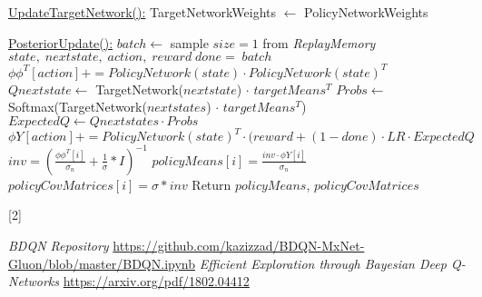 \documentclass{article}
\begin{document}
\begin{algorithm}
\begin{algorithmic}[2]
    \State \underline{UpdateTargetNetwork():}
        \State TargetNetworkWeights $\gets$ PolicyNetworkWeights

    \State \underline{PosteriorUpdate():}
            \State $batch \gets$ sample $size=1$ from \textit{ReplayMemory}
            \State $state,\;nextstate,\;action,\;reward\;done = \; batch$
            \State $\phi\phi^T[action] += PolicyNetwork(state) \cdot PolicyNetwork(state)^T$
            \State $Qnextstate \gets$ TargetNetwork($nextstate$) $\cdot$ $targetMeans^T$
            \State $Probs \gets$ Softmax(TargetNetwork($nextstates$) $\cdot$ $targetMeans^T$)
            \State $ExpectedQ \gets Qnextstates \cdot Probs$
            \State $\phi Y[action]  += PolicyNetwork(state)^T \cdot (reward + (1 - done) \cdot LR \cdot ExpectedQ$
        \EndFor
                \State $inv = (\frac{\phi\phi^T[i]}{\sigma_n}  + \frac{1}{\sigma} * I)^{-1}$
                \State $policyMeans[i] = \frac{inv \cdot \phi Y[i]}{\sigma_n}$
                \State $policyCovMatrices[i] = \sigma * inv$
        \EndFor
        \State Return $policyMeans$, $policyCovMatrices$
    \end{algorithmic}[2]
\end{algorithm}

\begin{thebibliography}{99}

\emph{BDQN Repository} \url{https://github.com/kazizzad/BDQN-MxNet-Gluon/blob/master/BDQN.ipynb}
\newline
{}
\emph{Efficient Exploration through Bayesian Deep Q-Networks} \url{https://arxiv.org/pdf/1802.04412}

\end{thebibliography}
\end{document}
